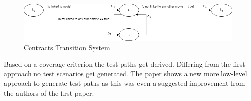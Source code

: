 \begin{figure}[h]
	\centering
	\includegraphics[width=\textwidth]{img/cts.png}
	\caption{Contracts Transition System}
	\label{cts}
\end{figure}

Based on a coverage criterion the test paths get derived. Differing from the first approach no test scenarios get generated. The paper shows a new more low-level approach to generate test paths as this was even a suggested improvement from the authors of the first paper. 
